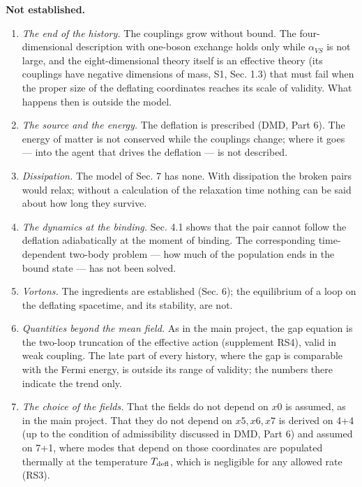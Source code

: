 \documentclass[
  10pt,
]{article}
\providecommand{\tightlist}{%
  \setlength{\itemsep}{0pt}\setlength{\parskip}{0pt}}
\begin{document}
\textbf{Not established.}

\begin{enumerate}
\def\labelenumi{\arabic{enumi}.}
\tightlist
\item
  \emph{The end of the history.} The couplings grow without bound. The
  four-dimensional description with one-boson exchange holds only while
  \(\alpha_{VS}\) is not large, and the eight-dimensional theory itself
  is an effective theory (its couplings have negative dimensions of
  mass, S1, Sec. 1.3) that must fail when the proper size of the
  deflating coordinates reaches its scale of validity. What happens then
  is outside the model.
\item
  \emph{The source and the energy.} The deflation is prescribed (DMD,
  Part 6). The energy of matter is not conserved while the couplings
  change; where it goes --- into the agent that drives the deflation ---
  is not described.
\item
  \emph{Dissipation.} The model of Sec. 7 has none. With dissipation the
  broken pairs would relax; without a calculation of the relaxation time
  nothing can be said about how long they survive.
\item
  \emph{The dynamics at the binding.} Sec. 4.1 shows that the pair
  cannot follow the deflation adiabatically at the moment of binding.
  The corresponding time-dependent two-body problem --- how much of the
  population ends in the bound state --- has not been solved.
\item
  \emph{Vortons.} The ingredients are established (Sec. 6); the
  equilibrium of a loop on the deflating spacetime, and its stability,
  are not.
\item
  \emph{Quantities beyond the mean field.} As in the main project, the
  gap equation is the two-loop truncation of the effective action
  (supplement RS4), valid in weak coupling. The late part of every
  history, where the gap is comparable with the Fermi energy, is outside
  its range of validity; the numbers there indicate the trend only.
\item
  \emph{The choice of the fields.} That the fields do not depend on
  \(x0\) is assumed, as in the main project. That they do not depend on
  \(x5,x6,x7\) is derived on 4+4 (up to the condition of admissibility
  discussed in DMD, Part 6) and assumed on 7+1, where modes that depend
  on those coordinates are populated thermally at the temperature
  \(T_{\rm defl}\), which is negligible for any allowed rate (RS3).
\end{enumerate}
\end{document}

